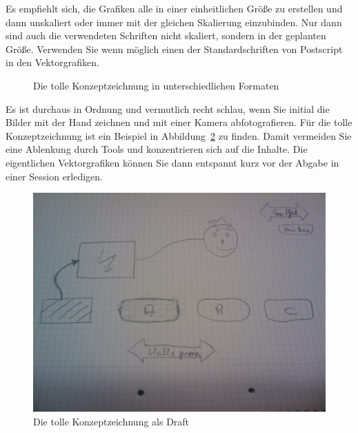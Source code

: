 \documentclass[11pt,a4paper]{report}
\begin{document}
Es empfiehlt sich, die Grafiken alle in einer einheitlichen Größe
zu erstellen und dann unskaliert oder immer mit der gleichen 
Skalierung einzubinden. 
Nur dann sind auch die verwendeten Schriften nicht skaliert, sondern 
in der geplanten Größe. 
Verwenden Sie wenn möglich einen der Standardschriften von Postscript 
in den Vektorgrafiken.

\begin{figure}[htb]
\centering
{}
\caption{Die tolle Konzeptzeichnung in unterschiedlichen Formaten}
\label{fig:tk2}
\end{figure}

Es ist durchaus in Ordnung und vermutlich recht schlau, wenn Sie initial 
die Bilder mit der Hand zeichnen und mit einer Kamera abfotografieren. 
Für die tolle Konzeptzeichnung ist ein Beispiel in 
Abbildung~\ref{fig:tkdraft} zu finden. 
Damit vermeiden Sie eine Ablenkung durch Tools und konzentrieren
sich auf die Inhalte. 
Die eigentlichen Vektorgrafiken können Sie dann entspannt kurz vor
der Abgabe in einer Session erledigen. 

\begin{figure}[htb]
\centering
\includegraphics[width=.4\textwidth]{images/zeichnungdraft} 
\caption{Die tolle Konzeptzeichnung als Draft}
\label{fig:tkdraft}
\end{figure}
\end{document}
